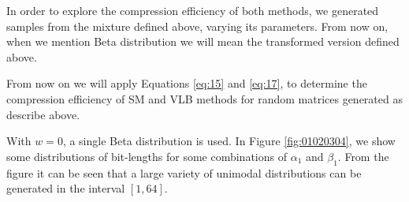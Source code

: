 \documentclass[10pt]{article}
\begin{document}
In order to explore the compression efficiency of both methods, we generated samples from the mixture defined above, varying its parameters. From now on, when we mention Beta distribution we will mean the transformed version defined above.

From now on we will apply Equations \ref{eq:15} and \ref{eq:17}, to determine the compression efficiency of SM and VLB methods for random matrices generated as describe above. 

With $w=0$, a single Beta distribution is used. In Figure \ref{fig:01020304}, we show some distributions of bit-lengths for some combinations of $\alpha_1$ and $\beta_1$. From the figure it can be seen that a large variety of unimodal distributions can be generated in the interval $[1,64]$.
 

\begin{figure}[ht]
  \centering
  \subfigure[$\alpha=1,\beta=32$]{
}
\end{figure}
\end{document}
